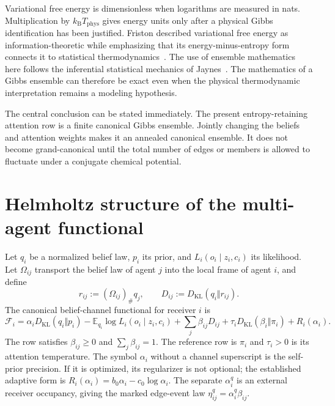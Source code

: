 \documentclass[11pt,letterpaper]{article}
\newcommand{\KL}{D_{\mathrm{KL}}}
\newcommand{\E}{\mathbb E}
\newcommand{\cF}{\mathcal F}
\newcommand{\push}{_{\#}}
\begin{document}
Variational free energy is dimensionless when logarithms are measured in nats.  Multiplication by $k_{\mathrm B}T_{\mathrm{phys}}$ gives energy units only after a physical Gibbs identification has been justified.  Friston described variational free energy as information-theoretic while emphasizing that its energy-minus-entropy form connects it to statistical thermodynamics~\cite{Friston2010}.  The use of ensemble mathematics here follows the inferential statistical mechanics of Jaynes~\cite{Jaynes1957}.  The mathematics of a Gibbs ensemble can therefore be exact even when the physical thermodynamic interpretation remains a modeling hypothesis.

The central conclusion can be stated immediately.  The present entropy-retaining attention row is a finite canonical Gibbs ensemble.  Jointly changing the beliefs and attention weights makes it an annealed canonical ensemble.  It does not become grand-canonical until the total number of edges or members is allowed to fluctuate under a conjugate chemical potential.

\section{Helmholtz structure of the multi-agent functional}

Let $q_i$ be a normalized belief law, $p_i$ its prior, and $L_i(o_i\mid z_i,c_i)$ its likelihood.  Let $\Omega_{ij}$ transport the belief law of agent $j$ into the local frame of agent $i$, and define
\begin{equation}
 r_{ij}:=(\Omega_{ij})\push q_j,
 \qquad
 D_{ij}:=\KL(q_i\Vert r_{ij}).
 \label{eq:transported-divergence}
\end{equation}
The canonical belief-channel functional for receiver $i$ is
\begin{equation}
 \boxed{
 \cF_i
 =\alpha_i\KL(q_i\Vert p_i)
 -\E_{q_i}\log L_i(o_i\mid z_i,c_i)
 +\sum_j\beta_{ij}D_{ij}
 +\tau_i\KL(\beta_i\Vert\pi_i)
 +R_i(\alpha_i).}
 \label{eq:canonical-agent-vfe}
\end{equation}
The row satisfies $\beta_{ij}\geq0$ and $\sum_j\beta_{ij}=1$.  The reference row is $\pi_i$ and $\tau_i>0$ is its attention temperature.  The symbol $\alpha_i$ without a channel superscript is the self-prior precision.  If it is optimized, its regularizer is not optional; the established adaptive form is $R_i(\alpha_i)=b_0\alpha_i-c_0\log\alpha_i$.  The separate $\alpha_i^q$ is an external receiver occupancy, giving the marked edge-event law $\eta_{ij}^q=\alpha_i^q\beta_{ij}$.
\end{document}
